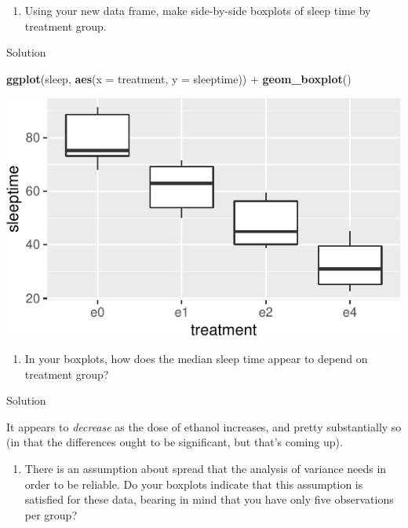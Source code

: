 \documentclass[]{tufte-book}
\newenvironment{Shaded}{}{}
\newcommand{\DataTypeTok}[1]{\textcolor[rgb]{0.56,0.13,0.00}{#1}}
\newcommand{\KeywordTok}[1]{\textcolor[rgb]{0.00,0.44,0.13}{\textbf{#1}}}
\newcommand{\NormalTok}[1]{#1}
\newcommand{\OperatorTok}[1]{\textcolor[rgb]{0.40,0.40,0.40}{#1}}
\newcommand{\StringTok}[1]{\textcolor[rgb]{0.25,0.44,0.63}{#1}}
\providecommand{\tightlist}{%
  \setlength{\itemsep}{0pt}\setlength{\parskip}{0pt}}
\theoremstyle{definition}
\theoremstyle{definition}
\theoremstyle{definition}
\theoremstyle{remark}
\begin{document}
\begin{enumerate}
\def\labelenumi{(\alph{enumi})}
\setcounter{enumi}{2}
\tightlist
\item
  Using your new data frame, make side-by-side boxplots of sleep time by
  treatment group.
\end{enumerate}

Solution

\begin{Shaded}
\begin{Highlighting}[]
\KeywordTok{ggplot}\NormalTok{(sleep, }\KeywordTok{aes}\NormalTok{(}\DataTypeTok{x =}\NormalTok{ treatment, }\DataTypeTok{y =}\NormalTok{ sleeptime)) }\OperatorTok{+}\StringTok{ }
\StringTok{    }\KeywordTok{geom_boxplot}\NormalTok{()}
\end{Highlighting}
\end{Shaded}

\includegraphics{11-tidying-and-selecting-data_files/figure-latex/unnamed-chunk-24-1}

\begin{enumerate}
\def\labelenumi{(\alph{enumi})}
\setcounter{enumi}{3}
\tightlist
\item
  In your boxplots, how does the median sleep time appear to depend on
  treatment group?
\end{enumerate}

Solution

It appears to \emph{decrease} as the dose of ethanol increases, and
pretty substantially so (in that the differences ought to be
significant, but that's coming up).

\begin{enumerate}
\def\labelenumi{(\alph{enumi})}
\setcounter{enumi}{4}
\tightlist
\item
  There is an assumption about spread that the analysis of variance
  needs in order to be reliable. Do your boxplots indicate that this
  assumption is satisfied for these data, bearing in mind that you have
  only five observations per group?
\end{enumerate}
\end{document}
